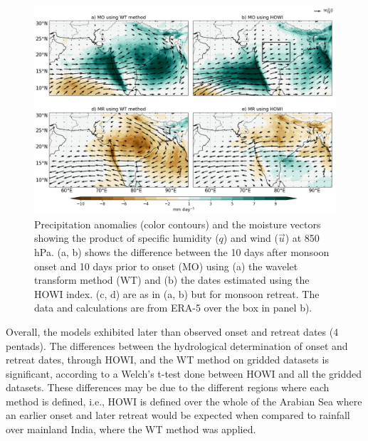 \begin{figure}[t!]
\centering
 \includegraphics[width=0.95\linewidth]{figures/wav_fig8.png}
\caption[Precipitation anomalies during Indian monsoon onset]{  Precipitation anomalies (color contours) and the moisture vectors showing the product of specific humidity ($q$) and wind ($\vec{u}$) at 850 hPa. (a, b) shows the difference between the 10 days after monsoon onset and 10 days prior to onset (MO) using (a) the wavelet transform method (WT) and (b) the dates estimated using the HOWI index. (c, d) are as in (a, b) but for monsoon retreat. The data and calculations are from ERA-5 over the box in panel b). }
\label{fig:wav_fig8}
\end{figure}

Overall, the models exhibited later than observed onset and retreat dates (4 pentads). The differences between the hydrological determination of onset and retreat dates, through HOWI, and the WT method on gridded datasets is significant, according to a Welch's t-test done between HOWI and all the gridded datasets. These differences may be due to the different regions where each method is defined, i.e., HOWI is defined over the whole of the Arabian Sea where an earlier onset and later retreat would be expected when compared to rainfall over mainland India, where the WT method was applied. 


